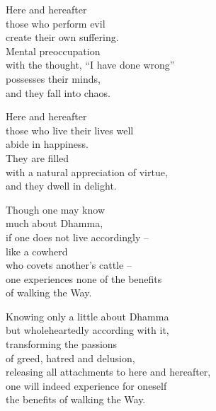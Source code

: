 Here and hereafter\\
those who perform evil\\
create their own suffering.\\
Mental preoccupation\\
with the thought, “I have done wrong”\\
possesses their minds,\\
and they fall into chaos.


Here and hereafter\\
those who live their lives well\\
abide in happiness.\\
They are filled\\
with a natural appreciation of virtue,\\
and they dwell in delight.


Though one may know\\
much about Dhamma,\\
if one does not live accordingly --\\
like a cowherd\\
who covets another's cattle --\\
one experiences none of the benefits\\
of walking the Way.


Knowing only a little about Dhamma\\
but wholeheartedly according with it,\\
transforming the passions\\
of greed, hatred and delusion,\\
releasing all attachments to here and hereafter,\\
one will indeed experience for oneself\\
the benefits of walking the Way.


